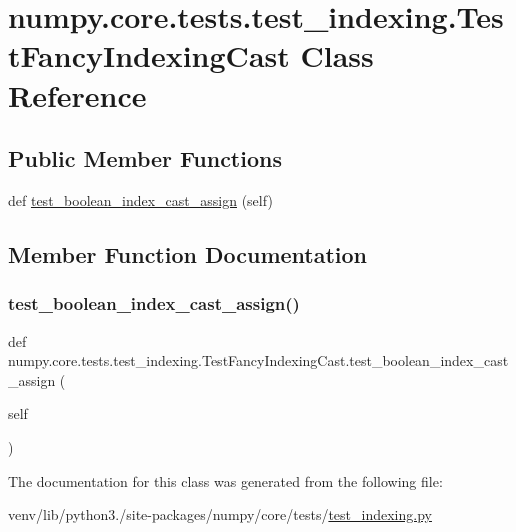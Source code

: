 \hypertarget{classnumpy_1_1core_1_1tests_1_1test__indexing_1_1TestFancyIndexingCast}{}\section{numpy.\+core.\+tests.\+test\+\_\+indexing.\+Test\+Fancy\+Indexing\+Cast Class Reference}
\label{classnumpy_1_1core_1_1tests_1_1test__indexing_1_1TestFancyIndexingCast}
\subsection*{Public Member Functions}
\begin{DoxyCompactItemize}
\item 
def \hyperlink{classnumpy_1_1core_1_1tests_1_1test__indexing_1_1TestFancyIndexingCast_a58a01e48b4a87ba8daf916c40bcc7a90}{test\+\_\+boolean\+\_\+index\+\_\+cast\+\_\+assign} (self)
\end{DoxyCompactItemize}


\subsection{Member Function Documentation}
\mbox{\label{classnumpy_1_1core_1_1tests_1_1test__indexing_1_1TestFancyIndexingCast_a58a01e48b4a87ba8daf916c40bcc7a90}} 
\subsubsection{\texorpdfstring{test\+\_\+boolean\+\_\+index\+\_\+cast\+\_\+assign()}{test\_boolean\_index\_cast\_assign()}}
{\footnotesize\ttfamily def numpy.\+core.\+tests.\+test\+\_\+indexing.\+Test\+Fancy\+Indexing\+Cast.\+test\+\_\+boolean\+\_\+index\+\_\+cast\+\_\+assign (\begin{DoxyParamCaption}\item[{}]{self }\end{DoxyParamCaption})}



The documentation for this class was generated from the following file\+:\begin{DoxyCompactItemize}
\item 
venv/lib/python3./site-\/packages/numpy/core/tests/\hyperlink{test__indexing_8py}{test\+\_\+indexing.\+py}\end{DoxyCompactItemize}
